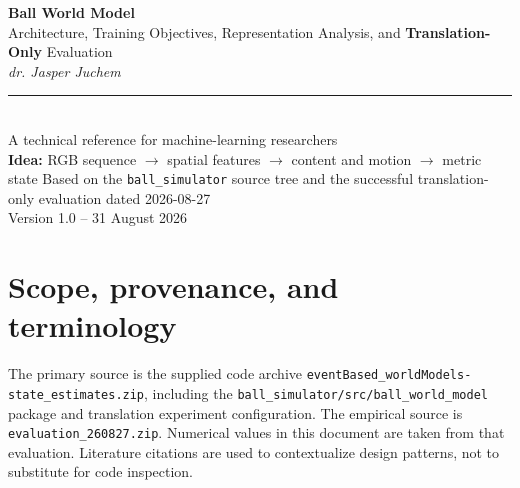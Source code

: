 \documentclass[11pt,a4paper]{article}
\begin{document}
\begin{titlepage}
\centering
\vspace*{30mm}
{\Huge\bfseries\color{navy} Ball World Model}\\[4mm]
{\LARGE Architecture, Training Objectives, Representation Analysis, and \textbf{Translation-Only} Evaluation}\\[7mm]
{\textit{dr. Jasper Juchem}}\\[7mm]
{\color{blue}\rule{\textwidth}{2.2pt}}\\[12mm]
{\large A technical reference for machine-learning researchers}\\[20mm]
{\large\color{navy}\textbf{Idea:} RGB sequence $\rightarrow$ spatial features $\rightarrow$ content and motion $\rightarrow$ metric state}
\vfill
{\large Based on the \texttt{ball\_simulator} source tree and the successful translation-only evaluation dated 2026-08-27}\\[5mm]
{\small Version 1.0 -- 31 August 2026}
\end{titlepage}
\begin{abstract}
This report reconstructs the complete translation-only neural state-estimation pipeline implemented in the supplied project source. It explains the tensor geometry, coordinate-aware convolutional encoder, differentiable soft-keypoint bottleneck, content and motion representations, bidirectional latent transition, supervised state heads, iterative metric-space physics corrector, loss design, data protocol, and evaluation methodology. The central empirical observation is a strong representation split: static content is almost perfectly linearly informative about position, while temporal differences and the learned motion representation are strongly informative about velocity. The report distinguishes what is directly guaranteed by the implementation from what is an interpretation supported by probes and interventions. It also clarifies the model's status as a finite-window neural observer with one-step latent predictive structure rather than an autonomous long-horizon simulator.
\end{abstract}
\tableofcontents
\clearpage{}

\section{Scope, provenance, and terminology}
The primary source is the supplied code archive \texttt{eventBased\_worldModels-state\_estimates.zip}, including the \texttt{ball\_simulator/src/ball\_world\_model} package and translation experiment configuration. The empirical source is \texttt{evaluation\_260827.zip}. Numerical values in this document are taken from that evaluation. Literature citations are used to contextualize design patterns, not to substitute for code inspection.
\end{document}
